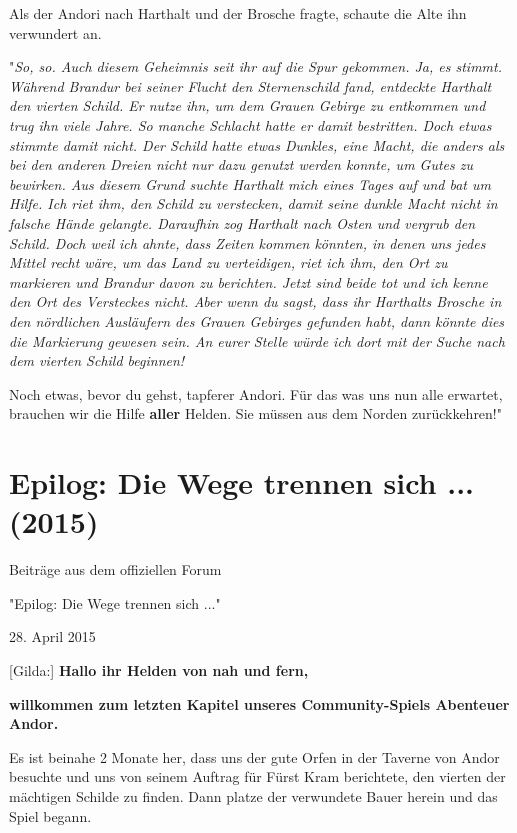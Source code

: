 \documentclass[10pt, a4paper, oneside]{book}
\newcommand{\fillbreak}{\vspace*{\fill}\columnbreak}
\newcommand{\storytext}[1]{%
    \section{#1}%
    \label{Storytext: #1}%
}
\newcommand{\bildmitts}[2][height=0.32\textwidth,width=0.48\textwidth,keepaspectratio]{%
    \begin{center}
        \texttt{[image: Chronik der Andorversen/Bilder/\#2]}
    \end{center}
}
\begin{document}
\begin{multicols}{2}
Als der Andori nach Harthalt und der Brosche fragte, schaute die Alte ihn verwundert an.\bigskip

"\textit{So, so. Auch diesem Geheimnis seit ihr auf die Spur gekommen. Ja, es stimmt. Während Brandur bei seiner Flucht den Sternenschild fand, entdeckte Harthalt den vierten Schild. Er nutze ihn, um dem Grauen Gebirge zu entkommen und trug ihn viele Jahre. So manche Schlacht hatte er damit bestritten. Doch etwas stimmte damit nicht. Der Schild hatte etwas Dunkles, eine Macht, die anders als bei den anderen Dreien nicht nur dazu genutzt werden konnte, um Gutes zu bewirken. Aus diesem Grund suchte Harthalt mich eines Tages auf und bat um Hilfe. Ich riet ihm, den Schild zu verstecken, damit seine dunkle Macht nicht in falsche Hände gelangte. Daraufhin zog Harthalt nach Osten und vergrub den Schild. Doch weil ich ahnte, dass Zeiten kommen könnten, in denen uns jedes Mittel recht wäre, um das Land zu verteidigen, riet ich ihm, den Ort zu markieren und Brandur davon zu berichten. Jetzt sind beide tot und ich kenne den Ort des Versteckes nicht. Aber wenn du sagst, dass ihr Harthalts Brosche in den nördlichen Ausläufern des Grauen Gebirges gefunden habt, dann könnte dies die Markierung gewesen sein. An eurer Stelle würde ich dort mit der Suche nach dem vierten Schild beginnen!}\bigskip

Noch etwas, bevor du gehst, tapferer Andori. Für das was uns nun alle erwartet, brauchen wir die Hilfe \textbf{aller} Helden. Sie müssen aus dem Norden zurückkehren!"




\fillbreak
\storytext{Epilog: Die Wege trennen sich ... (2015)}

\begin{center}
    Beiträge aus dem offiziellen Forum

    "Epilog: Die Wege trennen sich ..."

    28. April 2015
\end{center}

[Gilda:] \textbf{Hallo ihr Helden von nah und fern,}

\textbf{willkommen zum letzten Kapitel unseres Community-Spiels Abenteuer Andor.}

Es ist beinahe 2 Monate her, dass uns der gute Orfen in der Taverne von Andor besuchte und uns von seinem Auftrag für Fürst Kram berichtete, den vierten der mächtigen Schilde zu finden. Dann platze der verwundete Bauer herein und das Spiel begann.



\end{multicols}
\end{document}
